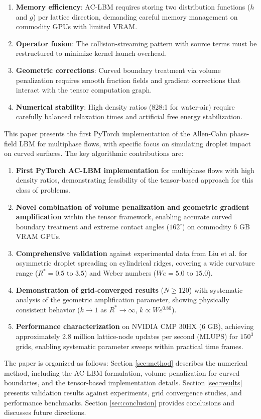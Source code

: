 \begin{enumerate}
    \item \textbf{Memory efficiency}: AC-LBM requires storing two distribution functions ($h$ and $g$) per lattice direction, demanding careful memory management on commodity GPUs with limited VRAM.
    \item \textbf{Operator fusion}: The collision-streaming pattern with source terms must be restructured to minimize kernel launch overhead.
    \item \textbf{Geometric corrections}: Curved boundary treatment via volume penalization requires smooth fraction fields and gradient corrections that interact with the tensor computation graph.
    \item \textbf{Numerical stability}: High density ratios (828:1 for water-air) require carefully balanced relaxation times and artificial free energy stabilization.
\end{enumerate}

This paper presents the first PyTorch implementation of the Allen-Cahn phase-field LBM for multiphase flows, with specific focus on simulating droplet impact on curved surfaces. The key algorithmic contributions are:

\begin{enumerate}
    \item \textbf{First PyTorch AC-LBM implementation} for multiphase flows with high density ratios, demonstrating feasibility of the tensor-based approach for this class of problems.

    \item \textbf{Novel combination of volume penalization and geometric gradient amplification} within the tensor framework, enabling accurate curved boundary treatment and extreme contact angles ($162^\circ$) on commodity 6 GB VRAM GPUs.

    \item \textbf{Comprehensive validation} against experimental data from Liu et al. \cite{liu2015symmetry} for asymmetric droplet spreading on cylindrical ridges, covering a wide curvature range ($R^* = 0.5$ to $3.5$) and Weber numbers ($We = 5.0$ to $15.0$).

    \item \textbf{Demonstration of grid-converged results} ($N \geq 120$) with systematic analysis of the geometric amplification parameter, showing physically consistent behavior ($k \to 1$ as $R^* \to \infty$, $k \propto We^{0.80}$).

    \item \textbf{Performance characterization} on NVIDIA CMP 30HX (6 GB), achieving approximately 2.8 million lattice-node updates per second (MLUPS) for $150^3$ grids, enabling systematic parameter sweeps within practical time frames.
\end{enumerate}

The paper is organized as follows: Section \ref{sec:method} describes the numerical method, including the AC-LBM formulation, volume penalization for curved boundaries, and the tensor-based implementation details. Section \ref{sec:results} presents validation results against experiments, grid convergence studies, and performance benchmarks. Section \ref{sec:conclusion} provides conclusions and discusses future directions.
